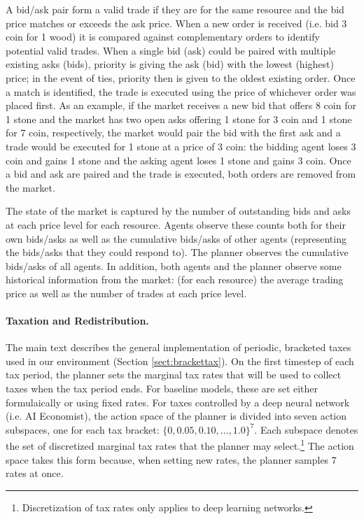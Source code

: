 A bid/ask pair form a valid trade if they are for the same resource and the bid price matches or exceeds the ask price.
When a new order is received (i.e. bid 3 coin for 1 wood) it is compared against complementary orders to identify potential valid trades.
When a single bid (ask) could be paired with multiple existing asks (bids), priority is giving the ask (bid) with the lowest (highest) price; in the event of ties, priority then is given to the oldest existing order.
Once a match is identified, the trade is executed using the price of whichever order was placed first.
As an example, if the market receives a new bid that offers 8 coin for 1 stone and the market has two open asks offering 1 stone for 3 coin and 1 stone for 7 coin, respectively, the market would pair the bid with the first ask and a trade would be executed for 1 stone at a price of 3 coin:
the bidding agent loses 3 coin and gains 1 stone and the asking agent loses 1 stone and gains 3 coin.
Once a bid and ask are paired and the trade is executed, both orders are removed from the market.

The state of the market is captured by the number of outstanding bids and asks at each price level for each resource.
Agents observe these counts both for their own bids/asks as well as the cumulative bids/asks of other agents (representing the bids/asks that they could respond to).
The planner observes the cumulative bids/asks of all agents.
In addition, both agents and the planner observe some historical information from the market: (for each resource) the average trading price as well as the number of trades at each price level.


\paragraph{Taxation and Redistribution.}
The main text describes the general implementation of periodic, bracketed taxes used in our environment (Section \ref{sect:brackettax}).
On the first timestep of each tax period, the planner sets the marginal tax rates that will be used to collect taxes when the tax period ends.
For baseline models, these are set either formulaically or using fixed rates.
For taxes controlled by a deep neural network (i.e. AI Economist), the action space of the planner is divided into seven action subspaces, one for each tax bracket: $\{0, 0.05, 0.10, \ldots, 1.0\}^7$.
Each subspace denotes the set of discretized marginal tax rates that the planner may select.\footnote{Discretization of tax rates only applies to deep learning networks.}
The action space takes this form because, when setting new rates, the planner samples 7 rates at once.

